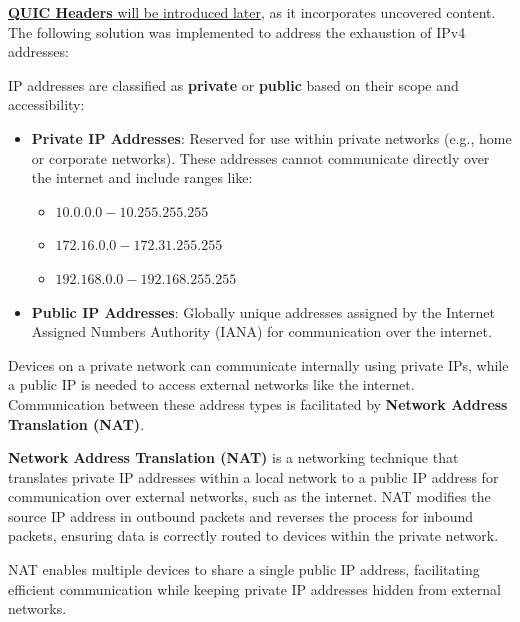 \noindent
\underline{\textbf{QUIC Headers} will be introduced later,} as it incorporates uncovered content. The following solution was implemented to address the exhaustion of IPv4 addresses:
\begin{Def}

    IP addresses are classified as \textbf{private} or \textbf{public} based on their scope and accessibility:
    \begin{itemize}
        \item \textbf{Private IP Addresses}: Reserved for use within private networks (e.g., home or corporate networks). These addresses cannot communicate directly over the internet and include ranges like:
            \begin{itemize}
                \item \(10.0.0.0 - 10.255.255.255\)
                \item \(172.16.0.0 - 172.31.255.255\)
                \item \(192.168.0.0 - 192.168.255.255\)
            \end{itemize}
        \item \textbf{Public IP Addresses}: Globally unique addresses assigned by the Internet Assigned Numbers Authority (IANA) for communication over the internet.
    \end{itemize}

    \noindent
    Devices on a private network can communicate internally using private IPs, while a public IP is needed to access external networks like the internet. Communication between these address types is facilitated by \textbf{Network Address Translation (NAT)}.
    \hfill \cite{rfc1918}
\end{Def}


\begin{Def}

    \textbf{Network Address Translation (NAT)} is a networking technique that translates private IP addresses within a local network to a public IP address for communication over external networks, such as the internet.
    NAT modifies the source IP address in outbound packets and reverses the process for inbound packets, ensuring data is correctly routed to devices within the private network.

    NAT enables multiple devices to share a single public IP address,
    facilitating efficient communication while keeping private IP addresses hidden from external networks.  \hfill \cite{rfc1918}\cite{rfc2663}   
\end{Def}

